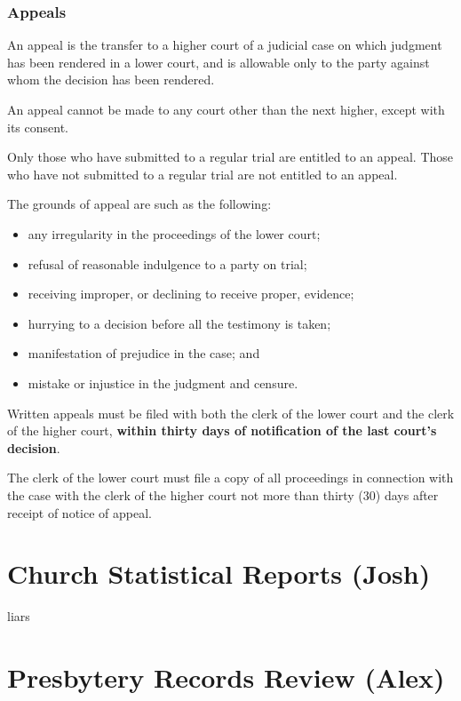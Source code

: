 \documentclass[
]{book}
\providecommand{\tightlist}{%
  \setlength{\itemsep}{0pt}\setlength{\parskip}{0pt}}
\begin{document}
\hypertarget{appeals}{%
\subsection{Appeals}\label{appeals}}

An appeal is the transfer to a higher court of a judicial case on which judgment has been rendered in a lower court, and is allowable only to the party against whom the decision has been rendered.

An appeal cannot be made to any court other than the next higher, except with its consent.

Only those who have submitted to a regular trial are entitled to an appeal. Those who have not submitted to a regular trial are not entitled to an appeal.

The grounds of appeal are such as the following:

\begin{itemize}
\tightlist
\item
  any irregularity in the proceedings of the lower court;
\item
  refusal of reasonable indulgence to a party on trial;
\item
  receiving improper, or declining to receive proper, evidence;
\item
  hurrying to a decision before all the testimony is taken;
\item
  manifestation of prejudice in the case; and
\item
  mistake or injustice in the judgment and censure.
\end{itemize}

Written appeals must be filed with both the clerk of the lower court and the clerk of the higher court, \textbf{within thirty days of notification of the last court's decision}.

The clerk of the lower court must file a copy of all proceedings in connection with the case with the clerk of the higher court not more than thirty (30) days after receipt of notice of appeal.

\hypertarget{church-statistical-reports-josh}{%
\chapter{Church Statistical Reports (Josh)}\label{church-statistical-reports-josh}}

liars

\hypertarget{presbytery-records-review-alex}{%
\chapter{Presbytery Records Review (Alex)}\label{presbytery-records-review-alex}}
\end{document}
